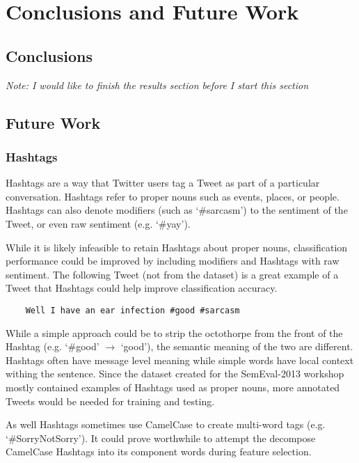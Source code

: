 \documentclass[final,3p,12pt]{elsarticle}
\begin{document}
\section{Conclusions and Future Work}

\subsection{Conclusions}

\textit{Note: I would like to finish the results section before I start this section }


\subsection{Future Work}

\subsubsection{Hashtags}

Hashtags are a way that Twitter users tag a Tweet as part of a particular
conversation. Hashtags refer to proper nouns such as events, places, or people.
Hashtags can also denote modifiers (such as `\#sarcasm') to the sentiment of the
Tweet, or even raw sentiment (e.g. `\#yay').

While it is likely infeasible to retain Hashtags about proper nouns,
classification performance could be improved by including modifiers and
Hashtags with raw sentiment. The following Tweet (not from the dataset) is a
great example of a Tweet that Hashtags could help improve classification
accuracy.

\begin{verbatim}
    Well I have an ear infection #good #sarcasm
\end{verbatim}

While a simple approach could be to strip the octothorpe from the front of the
Hashtag (e.g. `\#good' $\rightarrow$ `good'), the semantic meaning of the two
are different. Hashtags often have message level meaning while simple words
have local context withing the sentence. Since the dataset created for the
SemEval-2013 workshop mostly contained examples of Hashtags used as proper
nouns, more annotated Tweets would be needed for training and testing.

As well Hashtags sometimes use CamelCase to create multi-word tags (e.g.
`\#SorryNotSorry'). It could prove worthwhile to attempt the decompose
CamelCase Hashtags into its component words during feature selection.
\end{document}
